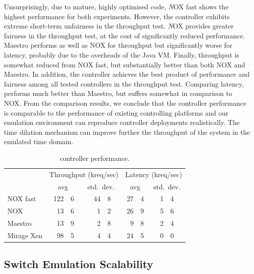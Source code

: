 Unsurprisingly, due to mature, highly optimised code, {\emph NOX fast} shows the
highest performance for both experiments. However, the controller exhibits
extreme short-term unfairness in the throughput test.  {\emph NOX} provides
greater fairness in the throughput test, at the cost of significantly reduced
performance. Maestro performs as well as NOX for throughput but significantly
worse for latency, probably due to the overheads of the Java VM\@.  Finally,
\mirage throughput is somewhat reduced from NOX fast, but substantially better
than both NOX and Maestro. In addition, the \mirage controller achieves the best
product of performance and fairness among all tested controllers in the
throughput test.  Comparing latency, \mirage performs much better than Maestro,
but suffers somewhat in comparison to NOX\@. From the comparison results, we
conclude that the \mirage controller performance is comparable to the
performance of existing controlling platforms and our emulation environment can
reproduce controller deployments realistically. The \sdnsim time dilation
mechanism can improve further the throughput of the system in the emulated time
domain.

\begin{table}
\newcommand\T{\rule{0pt}{2.6ex}}
\newcommand\B{\rule[-1.2ex]{0pt}{0pt}}
\centering
\begin{tabular} {l |r@{.}l r@{.}l|r@{.}l r@{.}l}
\hline
\T \multirow{2}{*}{Controller} 
   & \multicolumn{4}{c|}{Throughput (kreq/sec)}  
   & \multicolumn{4}{c}{Latency (kreq/sec)} \\
\B & \multicolumn{2}{c}{avg} & \multicolumn{2}{c|}{std.\ dev.} 
   & \multicolumn{2}{c}{avg} & \multicolumn{2}{c}{std.\ dev.} \\
\hline
\T NOX fast   & 122&6 & \quad{} 44&8 & 27&4 & \quad{} 1&4 \\
NOX           &  13&6 &  1&2 & 26&9 & 5&6 \\
Maestro       &  13&9 &  2&8 &  9&8 & 2&4 \\
\B Mirage Xen &  98&5 &  4&4 & 24&5 & 0&0 \\
\hline
\end{tabular}
\caption{\label{tbl:controller}\of controller performance.}
\end{table}

\subsection{Switch Emulation Scalability} \label{sec:of-switch-perf}

